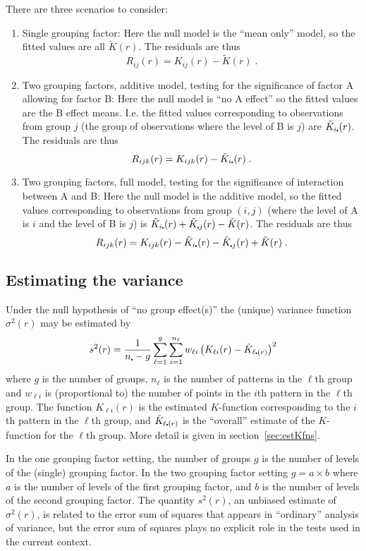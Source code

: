 \documentclass[12pt]{article}
\newcommand{\pullet}{\mbox{\scalebox{0.4}{$\bullet$}}}
\begin{document}
There are three scenarios to consider:
\begin{enumerate}
\item Single grouping factor:  Here the null model is the ``mean
only'' model, so the fitted values are all $\tilde{K}(r)$. The
residuals are thus
\[
R_{ij}(r) = K_{ij}(r) - \tilde{K}(r) \; .
\]
\item Two grouping factors, additive model, testing for the significance of
factor A allowing for factor B:   Here the null model is ``no A effect''
so the fitted values are the B effect means.  I.e. the fitted values corresponding
to observations from group $j$ (the group of observations where the level of
B is $j$) are $\tilde{K}_{i\pullet}(r)$.  The residuals are thus
\[
R_{ijk}(r) = K_{ijk}(r) - \tilde{K}_{i\pullet}(r) \; .
\]
\item Two grouping factors, full model, testing for the significance of
interaction between A and B:   Here the null model is the additive model,
so the fitted values corresponding to observations from group $(i,j)$
(where the level of A is $i$ and the level of B is $j$) is $\tilde{K}_{i\pullet}(r)
+ \tilde{K}_{\pullet j}(r) - \tilde{K}(r)$.  The residuals are thus
\[
R_{ijk}(r) = K_{ijk}(r) - \tilde{K}_{i\pullet}(r) - \tilde{K}_{\pullet j}(r)
                        + \tilde{K}(r) \; .
\]
\end{enumerate}

\subsection{Estimating the variance}
\label{sec:estVar}
Under the null hypothesis of ``no group effect(s)'' the (unique)
variance function $\sigma^2(r)$ may be estimated by
\begin{equation}
\label{eq:estvarfun}
s^2(r) = \frac{1}{n_{\pullet}-g} \sum_{\ell = 1}^g \sum_{i=1}^{n_\ell} w_{\ell i}
         \left ( K_{\ell i}(r) - \tilde{K}_{\ell \pullet(r)} \right )^2
\end{equation}
where $g$ is the number of groups, $n_{\ell}$ is the number of
patterns in the $\ell$th group and $w_{\ell i}$ is (proportional to)
the number of points in the $i$th pattern in the $\ell$th group.  The
function $K_{\ell i}(r)$ is the estimated $K$-function corresponding
to the $i$th pattern in the $\ell$th group, and $\tilde{K}_{\ell
\pullet(r)}$ is the ``overall'' estimate of the $K$-function for the
$\ell$th group.  More detail is given in section~\ref{sec:estKfns}.

In the one grouping factor setting, the number of groups $g$ is
the number of levels of the (single) grouping factor.  In the two
grouping factor setting $g = a \times b$ where $a$ is the number
of levels of the first grouping factor, and $b$ is the number of
levels of the second grouping factor.  The quantity $s^2(r)$,
an unbiased estimate of $\sigma^2(r)$, is related to the error
sum of squares that appears in ``ordinary'' analysis of variance,
but the error sum of squares plays no explicit role in the tests
used in the current context.
\end{document}
